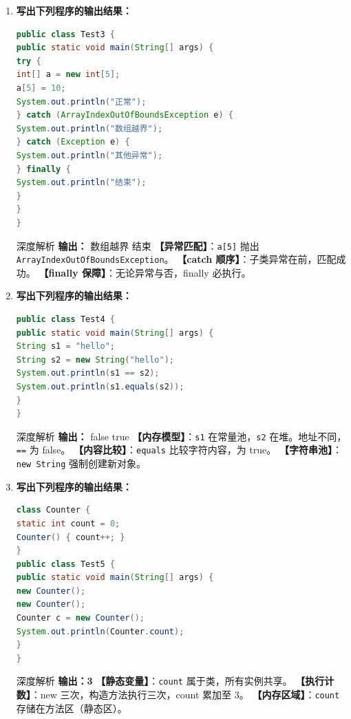 ﻿\documentclass[12pt, a4paper]{ctexart}
\newcommand{\code}[1]{\texttt{#1}}
\begin{document}
\begin{enumerate}[label=\textbf{\arabic*.}, itemsep=1em]
	\item \textbf{写出下列程序的输出结果：}
	      \begin{lstlisting}[language=Java]
public class Test3 {
public static void main(String[] args) {
try {
int[] a = new int[5];
a[5] = 10;
System.out.println("正常");
} catch (ArrayIndexOutOfBoundsException e) {
System.out.println("数组越界");
} catch (Exception e) {
System.out.println("其他异常");
} finally {
System.out.println("结束");
}
}
}
    \end{lstlisting}
	      \begin{bluebox}{深度解析}
		      \textbf{输出：}
		      数组越界
		      结束
		      \textbf{【异常匹配】}：\code{a[5]} 抛出 \code{ArrayIndexOutOfBoundsException}。
		      \textbf{【catch 顺序】}：子类异常在前，匹配成功。
		      \textbf{【finally 保障】}：无论异常与否，finally 必执行。
	      \end{bluebox}

	\item \textbf{写出下列程序的输出结果：}
	      \begin{lstlisting}[language=Java]
public class Test4 {
public static void main(String[] args) {
String s1 = "hello";
String s2 = new String("hello");
System.out.println(s1 == s2);
System.out.println(s1.equals(s2));
}
}
    \end{lstlisting}
	      \begin{bluebox}{深度解析}
		      \textbf{输出：}
		      false
		      true
		      \textbf{【内存模型】}：\code{s1} 在常量池，\code{s2} 在堆。地址不同，\code{==} 为 false。
		      \textbf{【内容比较】}：\code{equals} 比较字符内容，为 true。
		      \textbf{【字符串池】}：\code{new String} 强制创建新对象。
	      \end{bluebox}

	\item \textbf{写出下列程序的输出结果：}
	      \begin{lstlisting}[language=Java]
class Counter {
static int count = 0;
Counter() { count++; }
}
public class Test5 {
public static void main(String[] args) {
new Counter();
new Counter();
Counter c = new Counter();
System.out.println(Counter.count);
}
}
    \end{lstlisting}
	      \begin{bluebox}{深度解析}
		      \textbf{输出：3}
		      \textbf{【静态变量】}：\code{count} 属于类，所有实例共享。
		      \textbf{【执行计数】}：new 三次，构造方法执行三次，count 累加至 3。
		      \textbf{【内存区域】}：\code{count} 存储在方法区（静态区）。
	      \end{bluebox}
\end{enumerate}
\end{document}
